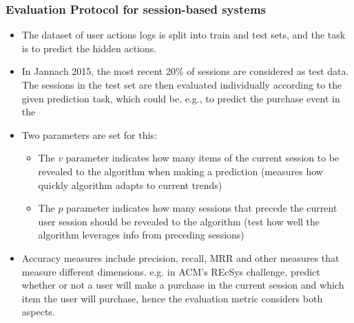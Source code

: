 \documentclass{article}
\begin{document}
\subsubsection{Evaluation Protocol for session-based systems}
\begin{itemize}
    \item The dataset of user actions logs is split into train and test sets, and the task is to predict the hidden actions.
    
    \item In Jannach 2015, the most recent 20\% of sessions are considered as test data. The sessions in the test set are then evaluated individually according to the given prediction task, which could be, e.g., to predict the purchase event in the 
    
    \item Two parameters are set for this: 
    \begin{itemize}
        \item The $v$ parameter indicates how many items of the current session to be revealed to the algorithm when making a prediction (measures how quickly algorithm adapts to current trends)
        
        \item The $p$ parameter indicates how many sessions that precede the current user session should be revealed to the algorithm (test how well the algorithm leverages info from preceding sessions)
    \end{itemize}
    
    \item Accuracy measures include precision, recall, MRR and other measures that measure different dimensions. e.g. in ACM's REcSys challenge, predict whether or not a user will make a purchase in the current session and which item the user will purchase, hence the evaluation metric considers both aspects. 
\end{itemize}
\end{document}
